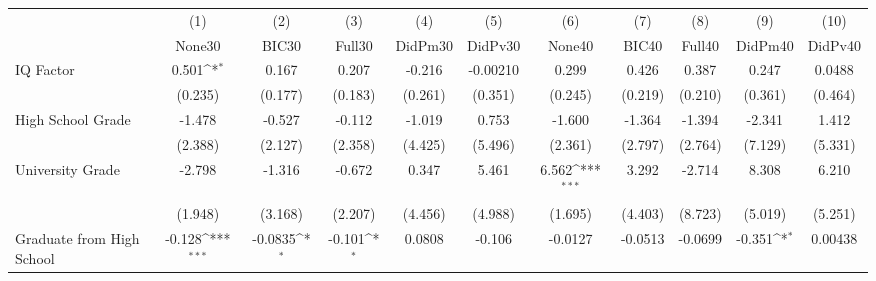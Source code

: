 {
\def\sym#1{\ifmmode^{#1}\else\(^{#1}\)\fi}
\begin{tabular}{l*{10}{c}}
\toprule
            &\multicolumn{1}{c}{(1)}&\multicolumn{1}{c}{(2)}&\multicolumn{1}{c}{(3)}&\multicolumn{1}{c}{(4)}&\multicolumn{1}{c}{(5)}&\multicolumn{1}{c}{(6)}&\multicolumn{1}{c}{(7)}&\multicolumn{1}{c}{(8)}&\multicolumn{1}{c}{(9)}&\multicolumn{1}{c}{(10)}\\
            &\multicolumn{1}{c}{None30}&\multicolumn{1}{c}{BIC30}&\multicolumn{1}{c}{Full30}&\multicolumn{1}{c}{DidPm30}&\multicolumn{1}{c}{DidPv30}&\multicolumn{1}{c}{None40}&\multicolumn{1}{c}{BIC40}&\multicolumn{1}{c}{Full40}&\multicolumn{1}{c}{DidPm40}&\multicolumn{1}{c}{DidPv40}\\
\midrule
IQ Factor   &       0.501\sym{*}  &       0.167         &       0.207         &      -0.216         &    -0.00210         &       0.299         &       0.426         &       0.387         &       0.247         &      0.0488         \\
            &     (0.235)         &     (0.177)         &     (0.183)         &     (0.261)         &     (0.351)         &     (0.245)         &     (0.219)         &     (0.210)         &     (0.361)         &     (0.464)         \\
\addlinespace
High School Grade&      -1.478         &      -0.527         &      -0.112         &      -1.019         &       0.753         &      -1.600         &      -1.364         &      -1.394         &      -2.341         &       1.412         \\
            &     (2.388)         &     (2.127)         &     (2.358)         &     (4.425)         &     (5.496)         &     (2.361)         &     (2.797)         &     (2.764)         &     (7.129)         &     (5.331)         \\
\addlinespace
University Grade&      -2.798         &      -1.316         &      -0.672         &       0.347         &       5.461         &       6.562\sym{***}&       3.292         &      -2.714         &       8.308         &       6.210         \\
            &     (1.948)         &     (3.168)         &     (2.207)         &     (4.456)         &     (4.988)         &     (1.695)         &     (4.403)         &     (8.723)         &     (5.019)         &     (5.251)         \\
\addlinespace
Graduate from High School&      -0.128\sym{***}&     -0.0835\sym{*}  &      -0.101\sym{*}  &      0.0808         &      -0.106         &     -0.0127         &     -0.0513         &     -0.0699         &      -0.351\sym{*}  &     0.00438         \\

\end{tabular}}
